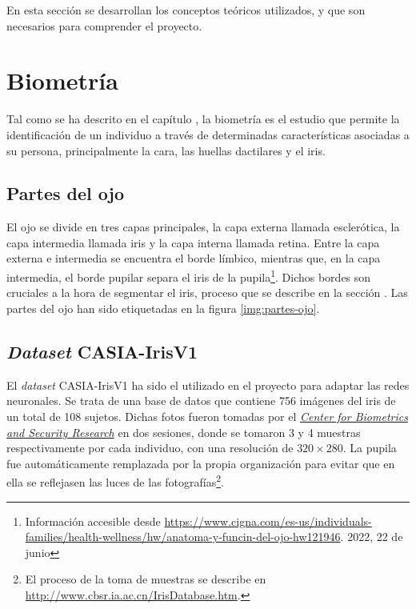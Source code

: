  \label{capitulo3}

En esta sección se desarrollan los conceptos teóricos utilizados, y que son necesarios para comprender el proyecto.

\section{Biometría}

Tal como se ha descrito en el capítulo , la biometría es el estudio que permite la identificación de un individuo a través de determinadas características asociadas a su persona, principalmente la cara, las huellas dactilares y el iris. 

\subsection{Partes del ojo} \label{partesojo} 

El ojo se divide en tres capas principales, la capa externa llamada esclerótica, la capa intermedia llamada iris y la capa interna llamada retina. Entre la capa externa e intermedia se encuentra el borde límbico, mientras que, en la capa intermedia, el borde pupilar separa el iris de la pupila\footnote{Información accesible desde \url{https://www.cigna.com/es-us/individuals-families/health-wellness/hw/anatoma-y-funcin-del-ojo-hw121946}. 2022, 22 de junio}.
Dichos bordes son cruciales a la hora de segmentar el iris, proceso que se describe en la sección .
Las partes del ojo han sido etiquetadas en la figura \ref{img:partes-ojo}.


\subsection{\textit{Dataset} CASIA-IrisV1 }	\label{casia}

El \textit{dataset} CASIA-IrisV1 ha sido el utilizado en el proyecto para adaptar las redes neuronales. Se trata de una base de datos que contiene 756 imágenes del iris de un total de 108 sujetos. 
Dichas fotos fueron tomadas por el \href{http://www.cbsr.ia.ac.cn/english/index.asp}{\textit{Center for Biometrics and Security Research}} en dos sesiones, donde se tomaron 3 y 4 muestras respectivamente por cada individuo, con una resolución de $320 \times 280$. 
La pupila fue automáticamente remplazada por la propia organización para evitar que en ella se reflejasen las luces de las fotografías\footnote{El proceso de la toma de muestras se describe en \url{http://www.cbsr.ia.ac.cn/IrisDatabase.htm}.}.

